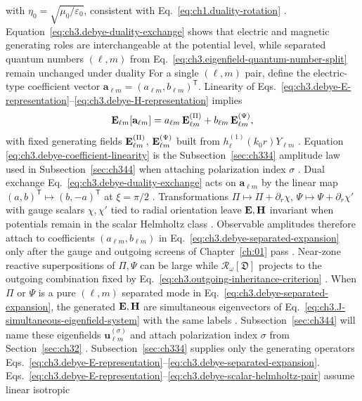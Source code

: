 with \(\eta_{0}=\sqrt{\mu_{0}/\varepsilon_{0}}\), consistent with Eq.~\eqref{eq:ch1.duality-rotation}
. Equation~\eqref{eq:ch3.debye-duality-exchange} shows that electric and
magnetic generating roles are interchangeable at the potential level, while separated quantum numbers
\((\ell,m)\) from Eq.~\eqref{eq:ch3.eigenfield-quantum-number-split} remain unchanged under duality
For a single \((\ell,m)\) pair, define the electric-type coefficient vector
\(\mathbf{a}_{\ell m}=(a_{\ell m},b_{\ell m})^{\mathsf{T}}\). Linearity of
Eqs.~\eqref{eq:ch3.debye-E-representation}--\eqref{eq:ch3.debye-H-representation} implies
\begin{equation}
\label{eq:ch3.debye-coefficient-linearity}
\mathbf{E}_{\ell m}[\mathbf{a}_{\ell m}]
=
a_{\ell m}\,\mathbf{E}_{\ell m}^{(\Pi)}
+
b_{\ell m}\,\mathbf{E}_{\ell m}^{(\Psi)},
\end{equation}
with fixed generating fields \(\mathbf{E}_{\ell m}^{(\Pi)}\), \(\mathbf{E}_{\ell m}^{(\Psi)}\) built from
\(h_{\ell}^{(1)}(k_{0}r)Y_{\ell m}\) . Equation
\eqref{eq:ch3.debye-coefficient-linearity} is the Subsection~\ref{sec:ch334} amplitude law used in
Subsection~\ref{sec:ch344} when attaching polarization index \(\sigma\) . Dual exchange
Eq.~\eqref{eq:ch3.debye-duality-exchange} acts on \(\mathbf{a}_{\ell m}\) by the linear map
\((a,b)^{\mathsf{T}}\mapsto(b,-a)^{\mathsf{T}}\) at \(\xi=\pi/2\) .
Transformations \(\Pi\mapsto\Pi+\partial_{r}\chi\), \(\Psi\mapsto\Psi+\partial_{r}\chi'\) with gauge scalars
\(\chi,\chi'\) tied to radial orientation leave \(\mathbf{E},\mathbf{H}\) invariant when potentials remain in the scalar
Helmholtz class . Observable amplitudes therefore attach to coefficients
\((a_{\ell m},b_{\ell m})\) in Eq.~\eqref{eq:ch3.debye-separated-expansion} only after the gauge and
outgoing screens of Chapter~\ref{ch:01} pass . Near-zone reactive
superpositions of \(\Pi,\Psi\) can be large while \(\mathcal{R}_\omega[\mathfrak{D}]\) projects to the
outgoing combination fixed by Eq.~\eqref{eq:ch3.outgoing-inheritance-criterion} .
When \(\Pi\) or \(\Psi\) is a pure \((\ell,m)\) separated mode in Eq.~\eqref{eq:ch3.debye-separated-expansion},
the generated \(\mathbf{E},\mathbf{H}\) are simultaneous eigenvectors of Eq.~\eqref{eq:ch3.J-simultaneous-eigenfield-system}
with the same labels . Subsection~\ref{sec:ch344} will name these eigenfields
\(\mathbf{u}_{\ell m}^{(\sigma)}\) and attach polarization index \(\sigma\) from Section~\ref{sec:ch32}
. Subsection~\ref{sec:ch334} supplies only the generating operators
Eqs.~\eqref{eq:ch3.debye-E-representation}--\eqref{eq:ch3.debye-separated-expansion}.
Eqs.~\eqref{eq:ch3.debye-E-representation}--\eqref{eq:ch3.debye-scalar-helmholtz-pair} assume linear isotropic
